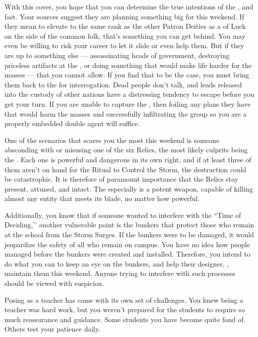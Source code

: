 \documentclass[char]{GL2020}
\begin{document}
With this cover, you hope that you can determine the true intentions of the \pGoaties{}, and fast. Your sources suggest they are planning something big for this weekend. If they mean to elevate \cGenesis{} to the same rank as the other Patron Deities as a \cGenesis{\Deity} of Luck on the side of the common folk, that's something you can get behind. You may even be willing to risk your career to let it slide or even help them. But if they are up to something else — assassinating heads of government, destroying priceless artifacts at the \pSchool{}, or doing something that would make life harder for the masses — that you cannot allow. If you find that to be the case, you must bring them back to the \pFarm{} for interrogation. Dead people don't talk, and leads released into the custody of other nations have a distressing tendency to escape before you get your turn. If you are unable to capture the \pGoaties{}, then foiling any plans they have that would harm the masses and successfully infiltrating the group so you are a properly embedded double agent will suffice.

One of the scenarios that scares you the most this weekend is someone absconding with or misusing one of the six Relics, the most likely culprits being the \pGoaties{}. Each one is powerful and dangerous in its own right, and if at least three of them aren't on hand for the Ritual to Control the Storm, the destruction could be catastrophic. It is therefore of paramount importance that the Relics stay present, attuned, and intact. The \iScythe{} especially is a potent weapon, capable of killing almost any entity that meets its blade, no matter how powerful.

Additionally, you know that if someone wanted to interfere with the ``Time of Deciding,’’ another vulnerable point is the bunkers that protect those who remain at the school from the Storm Surges. If the bunkers were to be damaged, it would jeopardize the safety of all who remain on campus. You have no idea how people managed before the bunkers were created and installed. Therefore, you intend to do what you can to keep an eye on the bunkers, and help their designer, \cBunker{\full}, maintain them this weekend. Anyone trying to interfere with such processes should be viewed with suspicion.

Posing as a teacher has come with its own set of challenges. You knew being a teacher was hard work, but you weren't prepared for the students to require so much reassurance and guidance. Some students you have become quite fond of. Others test your patience daily.
\end{document}
